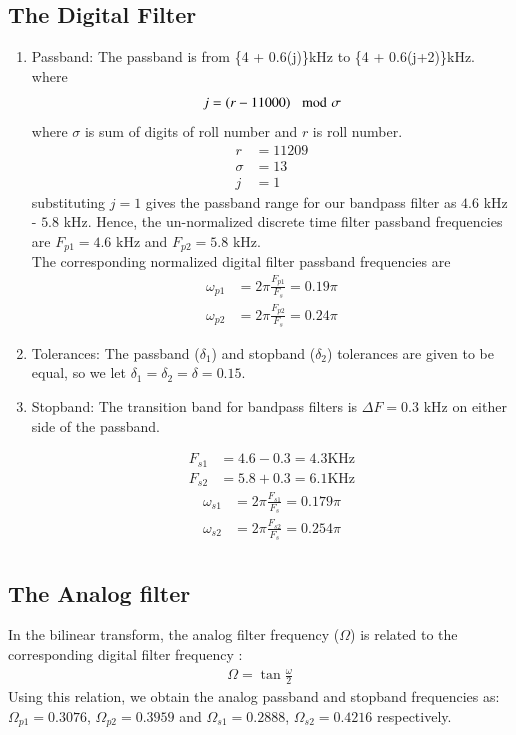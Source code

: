 \documentclass{article}
\begin{document}
	\subsection{The Digital Filter}
	\begin{enumerate}
		\item {Passband:}
		The passband is from \{4 + 0.6(j)\}kHz to \{4 + 0.6(j+2)\}kHz. \\
		where 
		\begin{align}
			j=\left(r-11000\right) \mod \sigma
		\end{align}
		where $\sigma$ is sum of digits of roll number and $r$ is roll number.\\
		\begin{align}
			r&=11209\\
			\sigma  &= 13\\
			j&=1
		\end{align}
		substituting $j =1$ gives the passband
		range for our bandpass filter as $4.6$ kHz - $5.8$ kHz.  Hence, the un-normalized discrete time filter
		passband frequencies are $F_{p1} = 4.6$ kHz
		and $F_{p2} = 5.8$ kHz. \\
		The corresponding normalized digital filter passband frequencies are
		\begin{align}
			\omega_{p1} &= 2\pi\frac{F_{p1}}{F_s} = 0.19 \pi\\
			\omega_{p2} &= 2\pi\frac{F_{p2}}{F_s}  =0.24 \pi
		\end{align}
		\item {Tolerances:}  The passband ($\delta_1$) and stopband ($\delta_2$) tolerances are given to
		be equal, so we let $\delta_1 = \delta_2 = \delta = 0.15$.
		
		\item { Stopband:}  The {transition band} for bandpass filters is $\Delta F = 0.3$ kHz on either side of the passband.
		
		\begin{align}
			F_{s1} &= 4.6-0.3 = 4.3 \text{KHz}\\
			F	_{s2} &= 5.8+0.3 = 6.1  \text{KHz}
		\end{align}
		\begin{align}
			\omega_{s1} &= 2\pi\frac{F_{s1}}{F_s} = 0.179 \pi\\
			\omega_{s2} &= 2\pi\frac{F_{s2}}{F_s} = 0.254 \pi\\
		\end{align}
	\end{enumerate}
	\subsection{The Analog filter}
	In the bilinear transform, the analog filter frequency ($\Omega$) is related to the corresponding digital filter frequency\brak{\omega} :
	\begin{align}
		\Omega = \tan \frac{\omega}{2}  
	\end{align}
	Using this relation, we obtain the analog passband and stopband frequencies as:
	$\Omega_{p1} = 0.3076$, $\Omega_{p2} = 0.3959$ and $\Omega_{s1} = 0.2888$, $\Omega_{s2} = 0.4216$
	respectively.
	
\end{document}
